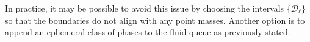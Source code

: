 \begin{rem}
In practice, it may be possible to avoid this issue by choosing the intervals \(\{\mathcal D_\ell\}\) so that the boundaries do not align with any point masses. Another option is to append an ephemeral class of phases to the fluid queue as previously stated. 

\end{rem}

